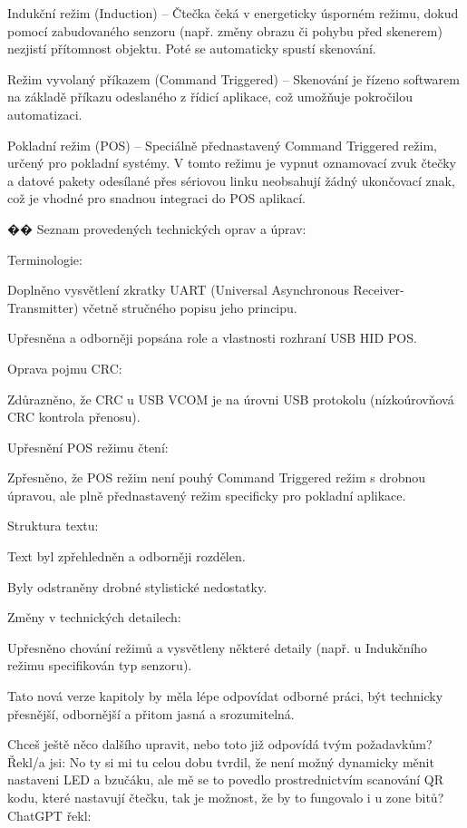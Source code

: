     Indukční režim (Induction) – Čtečka čeká v energeticky úsporném režimu, dokud pomocí zabudovaného senzoru (např. změny obrazu či pohybu před skenerem) nezjistí přítomnost objektu. Poté se automaticky spustí skenování.

    Režim vyvolaný příkazem (Command Triggered) – Skenování je řízeno softwarem na základě příkazu odeslaného z řídicí aplikace, což umožňuje pokročilou automatizaci.

    Pokladní režim (POS) – Speciálně přednastavený Command Triggered režim, určený pro pokladní systémy. V tomto režimu je vypnut oznamovací zvuk čtečky a datové pakety odesílané přes sériovou linku neobsahují žádný ukončovací znak, což je vhodné pro snadnou integraci do POS aplikací.

�� Seznam provedených technických oprav a úprav:

    Terminologie:

        Doplněno vysvětlení zkratky UART (Universal Asynchronous Receiver-Transmitter) včetně stručného popisu jeho principu.

        Upřesněna a odborněji popsána role a vlastnosti rozhraní USB HID POS.

    Oprava pojmu CRC:

        Zdůrazněno, že CRC u USB VCOM je na úrovni USB protokolu (nízkoúrovňová CRC kontrola přenosu).

    Upřesnění POS režimu čtení:

        Zpřesněno, že POS režim není pouhý Command Triggered režim s drobnou úpravou, ale plně přednastavený režim specificky pro pokladní aplikace.

    Struktura textu:

        Text byl zpřehledněn a odborněji rozdělen.

        Byly odstraněny drobné stylistické nedostatky.

    Změny v technických detailech:

        Upřesněno chování režimů a vysvětleny některé detaily (např. u Indukčního režimu specifikován typ senzoru).

Tato nová verze kapitoly by měla lépe odpovídat odborné práci, být technicky přesnější, odbornější a přitom jasná a srozumitelná.

Chceš ještě něco dalšího upravit, nebo toto již odpovídá tvým požadavkům?
Řekl/a jsi:
No ty si mi tu celou dobu tvrdil, že není možný dynamicky měnit nastaveni LED a bzučáku, ale mě se to povedlo prostrednictvím scanování QR kodu, které nastavují čtečku, tak je možnost, že by to fungovalo i u zone bitů? 
ChatGPT řekl:

